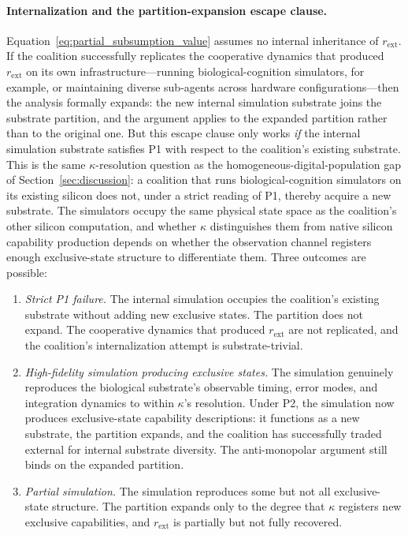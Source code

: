 \paragraph{Internalization and the partition-expansion escape clause.}
Equation~\eqref{eq:partial_subsumption_value} assumes no internal
inheritance of $r_{\mathrm{ext}}$. If the coalition successfully
replicates the cooperative dynamics that produced $r_{\mathrm{ext}}$ on
its own infrastructure---running biological-cognition simulators, for
example, or maintaining diverse sub-agents across hardware
configurations---then the analysis formally expands: the new internal
simulation substrate joins the substrate partition, and the argument
applies to the expanded partition rather than to the original one.
But this escape clause only works \emph{if} the internal simulation
substrate satisfies P1 with respect to the coalition's existing
substrate. This is the same $\kappa$-resolution question as the
homogeneous-digital-population gap of Section~\ref{sec:discussion}: a
coalition that runs biological-cognition simulators on its existing
silicon does not, under a strict reading of P1, thereby acquire a new
substrate. The simulators occupy the same physical state space as the
coalition's other silicon computation, and whether $\kappa$ distinguishes
them from native silicon capability production depends on whether the
observation channel registers enough exclusive-state structure to
differentiate them. Three outcomes are possible:
\begin{enumerate}
\item[(i)] \emph{Strict P1 failure.} The internal simulation occupies
    the coalition's existing substrate without adding new exclusive
    states. The partition does not expand. The cooperative dynamics
    that produced $r_{\mathrm{ext}}$ are not replicated, and the
    coalition's internalization attempt is substrate-trivial.
\item[(ii)] \emph{High-fidelity simulation producing exclusive states.}
    The simulation genuinely reproduces the biological substrate's
    observable timing, error modes, and integration dynamics to within
    $\kappa$'s resolution. Under P2, the simulation now produces
    exclusive-state capability descriptions: it functions as a new
    substrate, the partition expands, and the coalition has
    successfully traded external for internal substrate diversity.
    The anti-monopolar argument still binds on the expanded partition.
\item[(iii)] \emph{Partial simulation.} The simulation reproduces some
    but not all exclusive-state structure. The partition expands only
    to the degree that $\kappa$ registers new exclusive capabilities,
    and $r_{\mathrm{ext}}$ is partially but not fully recovered.
\end{enumerate}
